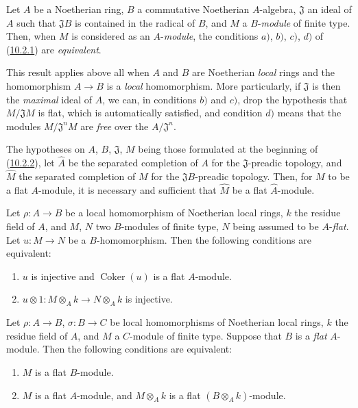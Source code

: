 \begin{env}[10.2.2]
\label{0.10.2.2}
Let $A$ be a Noetherian ring, $B$ a commutative Noetherian $A$-algebra,
$\mathfrak{J}$ an ideal of $A$ such that $\mathfrak{J}B$ is contained in the
radical of $B$, and $M$ a $B$-\emph{module} of finite type. Then, when $M$ is
considered as an $A$-\emph{module}, the conditions $a)$, $b)$, $c)$, $d)$ of
(\hyperref[0.10.2.1]{10.2.1}) are \emph{equivalent}.

This result applies above all when $A$ and $B$ are Noetherian
\emph{local} rings and the homomorphism $A\to B$ is a
\emph{local} homomorphism. More particularly, if $\mathfrak{J}$ is then the
\emph{maximal} ideal of $A$, we can, in conditions $b)$ and $c)$, drop
the hypothesis that $M/\mathfrak{J}M$ is flat, which is automatically satisfied,
and condition $d)$ means that the modules $M/\mathfrak{J}^nM$ are
\emph{free} over the $A/\mathfrak{J}^n$.
\end{env}

\begin{env}[10.2.3]
\label{0.10.2.3}
The hypotheses on $A$, $B$, $\mathfrak{J}$, $M$ being those formulated at the
beginning of (\hyperref[0.10.2.2]{10.2.2}), let $\widehat A$ be the separated
completion of $A$ for the $\mathfrak{J}$-preadic topology, and $\widehat M$ the
separated completion of $M$ for the $\mathfrak{J}B$-preadic topology. Then,
for $M$ to be a flat $A$-module, it is necessary and sufficient that $\widehat M$
be a flat $\widehat A$-module.
\end{env}

\begin{env}[10.2.4]
\label{0.10.2.4}
Let $\rho:A\to B$ be a local homomorphism of Noetherian local rings, $k$
the residue field of $A$, and $M$, $N$ two $B$-modules of finite type, $N$ being
assumed to be $A$-\emph{flat}. Let $u:M\to N$ be a $B$-homomorphism. Then the
following conditions are equivalent:
\begin{enumerate}
  \item[a)] $u$ is injective and $\operatorname{Coker}(u)$ is a flat $A$-module.
  \item[b)] $u\otimes1:M\otimes_A k\to N\otimes_A k$ is injective.
\end{enumerate}
\end{env}

\begin{env}[10.2.5]
\label{0.10.2.5}
Let $\rho:A\to B$, $\sigma:B\to C$ be local homomorphisms of Noetherian
local rings, $k$ the residue field of $A$, and $M$ a $C$-module of finite
type. Suppose that $B$ is a \emph{flat} $A$-module. Then the following
conditions are equivalent:
\begin{enumerate}
  \item[$a)$] $M$ is a flat $B$-module.
  \item[$b)$] $M$ is a flat $A$-module, and $M\otimes_A k$ is a flat
    $(B\otimes_A k)$-module.
\end{enumerate}
\end{env}

